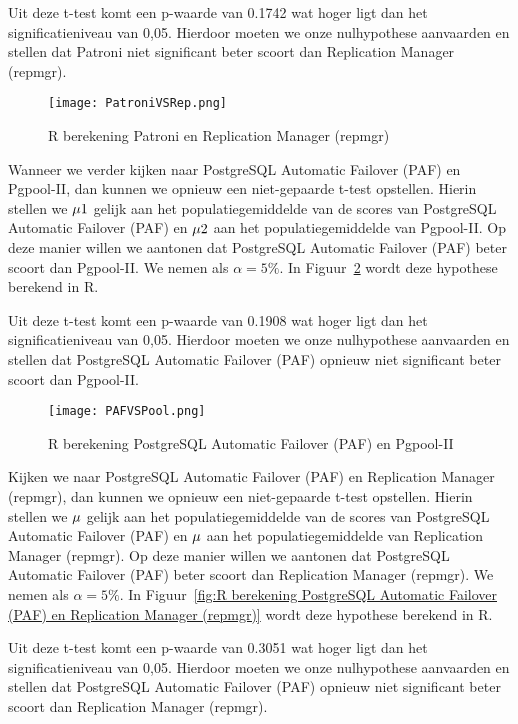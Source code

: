 Uit deze t-test komt een p-waarde van 0.1742 wat hoger ligt dan het significatieniveau van 0,05. Hierdoor moeten we onze nulhypothese aanvaarden en stellen dat Patroni niet significant beter scoort dan Replication Manager (repmgr).

\begin{figure}[!h]
    \centering
    \texttt{[image: PatroniVSRep.png]}
    \caption{R berekening Patroni en Replication Manager (repmgr)}
    \label{fig:R berekening Patroni en Replication Manager (repmgr)}
\end{figure}

Wanneer we verder kijken naar PostgreSQL Automatic Failover (PAF) en Pgpool-II, dan kunnen we opnieuw een niet-gepaarde t-test opstellen. Hierin stellen we $\mu1 \index{1}$ gelijk aan het populatiegemiddelde van de scores van PostgreSQL Automatic Failover (PAF) en $\mu2 \index{2}$ aan het populatiegemiddelde van Pgpool-II. Op deze manier willen we aantonen dat PostgreSQL Automatic Failover (PAF) beter scoort dan Pgpool-II. We nemen als $\alpha = 5\%$. In Figuur~\ref{fig:R berekening PostgreSQL Automatic Failover (PAF) en Pgpool-II} wordt deze hypothese berekend in R.

Uit deze t-test komt een p-waarde van 0.1908 wat hoger ligt dan het significatieniveau van 0,05. Hierdoor moeten we onze nulhypothese aanvaarden en stellen dat PostgreSQL Automatic Failover (PAF) opnieuw niet significant beter scoort dan Pgpool-II.

\begin{figure}[!h]
    \centering
    \texttt{[image: PAFVSPool.png]}
    \caption{R berekening PostgreSQL Automatic Failover (PAF) en Pgpool-II}
    \label{fig:R berekening PostgreSQL Automatic Failover (PAF) en Pgpool-II}
\end{figure}

Kijken we naar PostgreSQL Automatic Failover (PAF) en Replication Manager (repmgr), dan kunnen we opnieuw een niet-gepaarde t-test opstellen. Hierin stellen we $\mu\index{1}$ gelijk aan het populatiegemiddelde van de scores van PostgreSQL Automatic Failover (PAF) en $\mu\index{2}$ aan het populatiegemiddelde van Replication Manager (repmgr). Op deze manier willen we aantonen dat PostgreSQL Automatic Failover (PAF) beter scoort dan Replication Manager (repmgr). We nemen als $\alpha = 5\%$. In Figuur~\ref{fig:R berekening PostgreSQL Automatic Failover (PAF) en Replication Manager (repmgr)} wordt deze hypothese berekend in R.

Uit deze t-test komt een p-waarde van 0.3051 wat hoger ligt dan het significatieniveau van 0,05. Hierdoor moeten we onze nulhypothese aanvaarden en stellen dat PostgreSQL Automatic Failover (PAF) opnieuw niet significant beter scoort dan Replication Manager (repmgr).


